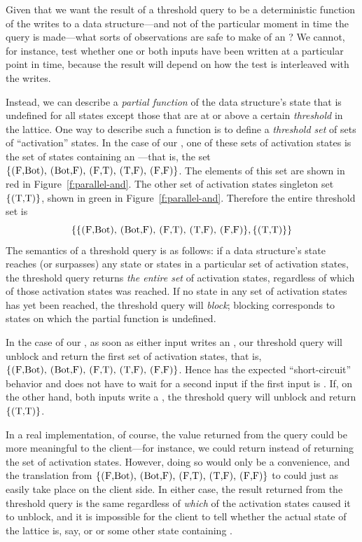 Given that we want the result of a threshold query to be a deterministic
function of the writes to a data structure---and not of the particular moment in
time the query is made---what sorts of observations are safe to make of an ?
We cannot, for instance, test whether one or both inputs have been
written at a particular point in time, because the result will 
depend on how the test is interleaved with the writes.

Instead, we can describe a \emph{partial function} of the data
structure's state that is undefined for all states except those that
are at or above a certain \emph{threshold} in the lattice.
One way to describe such a function is to define a \emph{threshold
  set} of sets of ``activation'' states.  In the case of our
, one of these sets of activation states is the set of
states containing an ---that is, the set $\{
\textrm{\il{(F,Bot)}, \il{(Bot,F)}, \il{(F,T)}, \il{(T,F)},
  \il{(F,F)}} \}$.  The elements of this set are shown in red in
Figure~\ref{f:parallel-and}.  The other set of activation states
singleton set $\{ \textrm{\il{(T,T)}} \}$, shown in green in
Figure~\ref{f:parallel-and}.  Therefore the entire threshold set is
\[
\{ 
\{ \textrm{\il{(F,Bot)}, \il{(Bot,F)}, \il{(F,T)}, \il{(T,F)}, \il{(F,F)}} \},
\{ \textrm{\il{(T,T)}} \}
\}
\]
The semantics of a threshold query is as follows: if a data structure's state
reaches (or surpasses) any state or states in a particular set of activation
states, the threshold query returns \emph{the entire set} of
activation states, regardless of which of those activation states was reached. If
no state in any set of activation states has yet been reached, the
threshold query will \emph{block}; blocking corresponds to states on
which the partial function is undefined.

In the case of our , as soon as either input writes an
, our threshold query will unblock and return the first set of
activation states, that is, $\{ \textrm{\il{(F,Bot)}, \il{(Bot,F)},
  \il{(F,T)}, \il{(T,F)}, \il{(F,F)}} \}$.  Hence  has the
expected ``short-circuit'' behavior and does not have to wait for a
second input if the first input is .  If, on the other hand, both
inputs write a , the threshold query will unblock and return $\{
\textrm{\il{(T,T)}} \}$.

In a real implementation,
of course, the value returned from the query could be more meaningful
to the client---for instance, we could return 
instead of returning the set of activation states.  However,
doing so would only be a convenience, and the translation from $\{
\textrm{\il{(F,Bot)}, \il{(Bot,F)}, \il{(F,T)}, \il{(T,F)},
  \il{(F,F)}} \}$ to  could just as easily take place on the
client side.  In either case, the result returned from the
threshold query is the same regardless of \emph{which} of the activation
states caused it to unblock, and it is impossible for the client to
tell whether the actual state of the lattice is, say,  or
 or some other state containing .

